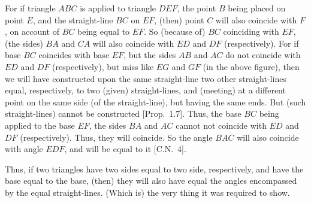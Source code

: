 \begin{Parallel}{}{}
{\epsfysize=2in
\centerline{}

For if triangle $ABC$ is applied to triangle $DEF$, the point $B$ being placed on
point $E$, and the straight-line $BC$ on $EF$, (then) point $C$ will also coincide with $F$, on
account of $BC$ being equal to $EF$.
So  (because of) $BC$ coinciding with $EF$,  (the sides) $BA$ and $CA$ will also
coincide with  $ED$ and $DF$ (respectively). 
For if base $BC$ coincides with base $EF$, but the sides $AB$ and $AC$ 
do not coincide with $ED$ and $DF$ (respectively), but miss like $EG$
and $GF$ (in the above figure), 
then we will have constructed upon the same straight-line two other straight-lines equal, respectively, to two (given) straight-lines,  and (meeting)
at a different point on the same
side (of the straight-line), but having the same ends. But (such straight-lines) cannot be constructed [Prop.~1.7].
Thus,  the base $BC$ being applied to the  base $EF$,  the sides $BA$ and $AC$
cannot not coincide with $ED$ and $DF$ (respectively). Thus, they
will coincide. So the angle $BAC$ will also coincide with angle $EDF$,
and will be equal to it [C.N.~4].

Thus, if two triangles have  two  sides equal to two side, respectively,
and  have the base equal to the base, (then) they will also have equal the angles  encompassed by
the equal straight-lines. (Which is) the very thing it was required to show.}
\end{Parallel}


